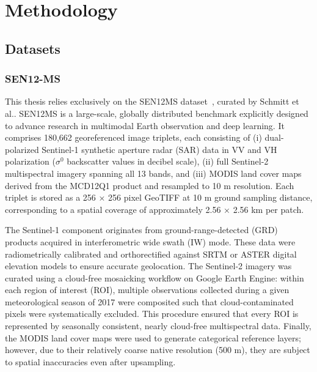 \chapter{Methodology}

\section{Datasets}
\subsection{SEN12-MS}
This thesis relies exclusively on the SEN12MS dataset~\cite{sen12ms_2019}, curated by Schmitt et al.. SEN12MS is a large-scale, globally distributed benchmark explicitly designed to advance research in multimodal Earth observation and deep learning. It comprises 180,662 georeferenced image triplets, each consisting of (i) dual-polarized Sentinel-1 synthetic aperture radar (SAR) data in VV and VH polarization ($\sigma^{0}$ backscatter values in decibel scale), (ii) full Sentinel-2 multispectral imagery spanning all 13 bands, and (iii) MODIS land cover maps derived from the MCD12Q1 product and resampled to 10 m resolution. Each triplet is stored as a 256 × 256 pixel GeoTIFF at 10 m ground sampling distance, corresponding to a spatial coverage of approximately 2.56 × 2.56 km per patch.

The Sentinel-1 component originates from ground-range-detected (GRD) products acquired in interferometric wide swath (IW) mode. These data were radiometrically calibrated and orthorectified against SRTM or ASTER digital elevation models to ensure accurate geolocation. The Sentinel-2 imagery was curated using a cloud-free mosaicking workflow on Google Earth Engine: within each region of interest (ROI), multiple observations collected during a given meteorological season of 2017 were composited such that cloud-contaminated pixels were systematically excluded. This procedure ensured that every ROI is represented by seasonally consistent, nearly cloud-free multispectral data. Finally, the MODIS land cover maps were used to generate categorical reference layers; however, due to their relatively coarse native resolution (500 m), they are subject to spatial inaccuracies even after upsampling.

